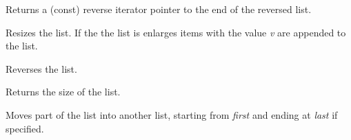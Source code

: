 \label{wxlistrend}



Returns a (const) reverse iterator pointer to the end of the
reversed list.

\label{wxlistresize}


Resizes the list. If the the list is enlarges items with
the value {\it v} are appended to the list.

\label{wxlistreverse}


Reverses the list.

\label{wxlistsize}


Returns the size of the list.

\label{wxlistsplice}




Moves part of the list into another list, starting from {\it first} and 
ending at {\it last} if specified.

